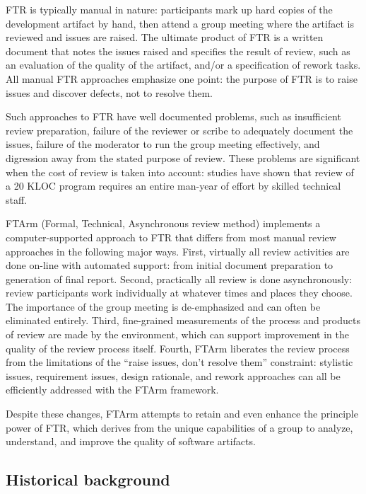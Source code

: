 FTR is typically manual in nature: participants mark up hard copies of
the development artifact by hand, then attend a group meeting where
the artifact is reviewed and issues are raised. The ultimate product
of FTR is a written document that notes the issues raised and
specifies the result of review, such as an evaluation of the quality
of the artifact, and/or a specification of rework tasks. All manual
FTR approaches emphasize one point: the purpose of FTR is to raise
issues and discover defects, not to resolve them.

Such approaches to FTR have well documented problems, such as
insufficient review preparation, failure of the reviewer or scribe to
adequately document the issues, failure of the moderator to run the
group meeting effectively, and digression away from the stated purpose
of review. These problems are significant when the cost of review is
taken into account: studies have shown that review of a 20 KLOC
program requires an entire man-year of effort by skilled technical
staff. 

FTArm (Formal, Technical, Asynchronous review method)
implements a computer-supported approach to FTR that differs from
most manual review approaches in the following major ways. First,
virtually all review activities are done on-line with automated
support: from initial document preparation to generation of final
report. Second, practically all review is done asynchronously: review
participants work individually at whatever times and places they
choose. The importance of the group meeting is de-emphasized and can
often be eliminated entirely. Third, fine-grained measurements of the
process and products of review are made by the environment, which can
support improvement in the quality of the review process
itself. Fourth, FTArm liberates the review process from the limitations
of the ``raise issues, don't resolve them'' constraint: stylistic
issues, requirement issues, design rationale, and rework approaches
can all be efficiently addressed with the FTArm framework. 

Despite these changes, FTArm attempts to retain and even enhance the
principle power of FTR, which derives from the unique capabilities of
a group to analyze, understand, and improve the quality of software
artifacts. 


\subsection {Historical background}

